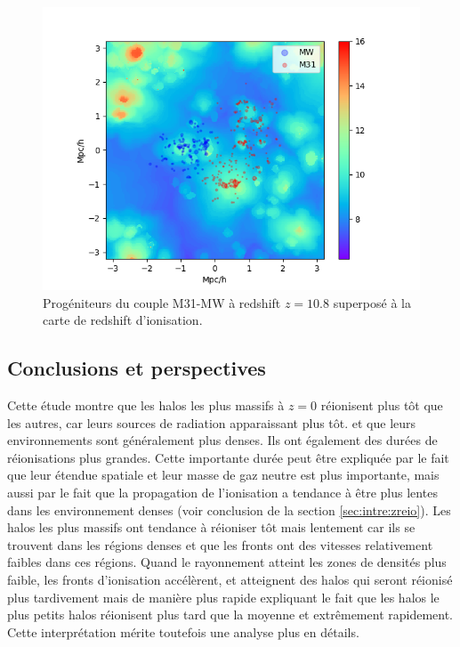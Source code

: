 \begin{figure}
		\centering
		\includegraphics[width=.95\linewidth]{img/05/map_LG.png}
        \caption[Réionisation du groupe local]{Progéniteurs du couple M31-MW à redshift $z=10.8$ superposé à la carte de redshift d'ionisation.
		\label{fig:CODA_LG}}
\end{figure}


\subsection{Conclusions et perspectives}


Cette étude montre que les halos les plus massifs à $z=0$ réionisent plus tôt que les autres, car leurs sources de radiation apparaissant plus tôt. et que leurs environnements sont généralement plus denses.
Ils ont également des durées de réionisations plus grandes.
Cette importante durée peut être expliquée par le fait que leur étendue spatiale et leur masse de gaz neutre est plus importante, mais aussi par le fait que la propagation de l'ionisation a tendance à être plus lentes dans les environnement denses (voir conclusion de la section \ref{sec:intre:zreio}).
Les halos les plus massifs ont tendance à réioniser tôt mais lentement car ils se trouvent dans les régions denses et que les fronts ont des vitesses relativement faibles dans ces régions. %
Quand le rayonnement atteint les zones de densités plus faible, les fronts d'ionisation accélèrent, et atteignent des halos qui seront réionisé plus tardivement mais de manière plus rapide expliquant le fait que les halos le plus petits halos réionisent plus tard que la moyenne et extrêmement rapidement.
Cette interprétation mérite toutefois une analyse plus en détails.

